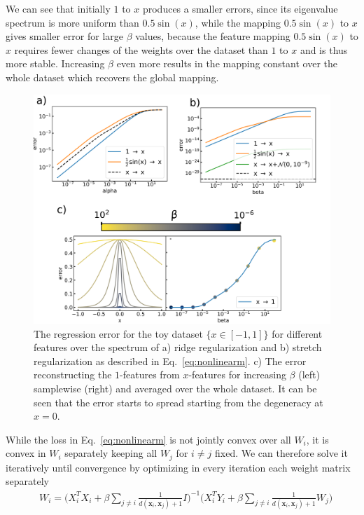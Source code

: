 We can see that initially $1$ to $x$ produces a smaller errors, since its eigenvalue spectrum is more uniform than $0.5\sin(x)$, while the mapping $0.5\sin(x)$ to $x$ gives smaller error for large $\beta$ values, because the feature mapping $0.5\sin(x)$ to $x$ requires fewer changes of the weights over the dataset than $1$ to $x$ and is thus more stable.
Increasing $\beta$ even more results in the mapping constant over the whole dataset which recovers the global mapping.
\begin{figure}
    \centering
    \includegraphics[width=\textwidth]{fig/nonlinear-measure_toy-example.png}
    \caption{The regression error for the toy dataset $\{x\in [-1,1]\}$ for different features over the spectrum of a) ridge regularization and b) stretch regularization as described in Eq.~\ref{eq:nonlinearm}. c) The error reconstructing the $1$-features from $x$-features for increasing $\beta$ (left) samplewise (right) and averaged over the whole dataset. It can be seen that the error starts to spread starting from the degeneracy at $x=0$.}
    \label{fig:nonlinearm}
\end{figure}

While the loss in Eq.~\ref{eq:nonlinearm} is not jointly convex over all $W_i$, it is convex in $W_i$ separately keeping all $W_j$ for $i\neq j$ fixed\cite{LI2015127}.
We can therefore solve it iteratively until convergence by optimizing in every iteration each weight matrix separately
\begin{align}
&W_i
= \big(X_i^TX_i+\beta\sum_{j\neq i}\frac{1}{d(\mathbf{x}_i,\mathbf{x}_j)+1}I)^{-1} \big(X_i^TY_i +  \beta\sum_{j\neq i} \frac{1}{d(\mathbf{x}_i,\mathbf{x}_j)+1} W_j\big)
\end{align}

